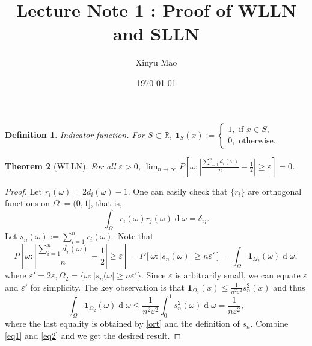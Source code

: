 \documentclass[12pt]{article}
\title{Lecture Note 1 : Proof of WLLN and SLLN}
\author{Xinyu Mao}
\date{\today}
\newtheorem{theorem}{Theorem}
\newtheorem{definition}[theorem]{Definition}
\newcommand\Real{\mathbb{R}}
\newcommand\one{\bm{1}}
\newcommand\eps{\varepsilon}
\DeclareMathOperator{\diff}{d}
\begin{document}
\maketitle

\begin{definition}{Indicator function.}
For $S \subset \Real$,  $\one_S(x) := \begin{cases}
    1, \text{ if $x \in S$}, \\
    0, \text{ otherwise.}
\end{cases}    
$
\end{definition}

\begin{theorem}[WLLN]\label{wlln}
    For all $\eps > 0$, $\lim_{n \to \infty} P[\omega : |\frac{\sum_{i=1}^n d_i(\omega)}{n} - \frac{1}{2}| \geq \eps] = 0$.
\end{theorem}
\begin{proof}
    Let $r_i(\omega) = 2d_i(\omega) - 1$. 
    One can easily check that $\{r_i\}$ are orthogonal functions
    on $\Omega := (0,1]$, that is,
    \begin{equation} \label{ort}
        \int_{\Omega} r_i(\omega)r_j(\omega) \diff \omega = \delta_{ij}.
    \end{equation}
    Let $s_n(\omega) := \sum_{i=1}^n r_i(\omega)$.
    Note that 
    \begin{equation} \label{eq1}
        P\left[\omega : \left|\frac{\sum_{i=1}^n d_i(\omega)}{n} - \frac{1}{2}\right| \geq \eps\right]
        = P[\omega : |s_n(\omega)| \ge n\eps']  
        = \int_{\Omega} \one_{\Omega_2}(\omega) \diff \omega,
    \end{equation}
    where $\eps' = 2\eps, \Omega_2 = \{\omega : |s_n(\omega| \geq n\eps'\}$.
    Since $\eps$ is arbitrarily small,  we can equate $\eps$ and $\eps'$ for simplicity.
    The key observation is that $\one_{\Omega_2}(x) \leq \frac{1}{n^2\eps^2}s_n^2(x)$ and thus
    \begin{equation} \label{eq2}
        \int_{\Omega} \one_{\Omega_2}(\omega) \diff \omega
        \leq \frac{1}{n^2\eps^2} \int_0^1 s_n^2(\omega) \diff \omega
        = \frac{1}{n\eps^2},
    \end{equation}
    where the last equality is obtained by \cref{ort} and the definition of $s_n$.
    Combine \cref{eq1} and \cref{eq2}
    and we get the desired result.
\end{proof}
\end{document}
